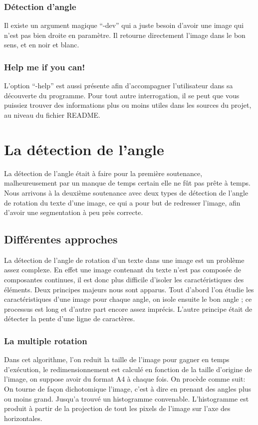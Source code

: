 \documentclass[a4paper,10pt]{report}
\begin{document}
\subsection{ D\'etection d'angle}
 Il existe un argument magique ``-dev'' qui a juste besoin d'avoir une
 image qui n'est pas bien droite en param\`etre. Il retourne directement
 l'image dans le bon sens, et en noir et blanc.
\subsection{ Help me if you can! }
 L'option ``-help'' est aussi pr\'esente afin d'accompagner
 l'utilisateur dans sa d\'ecouverte du programme. Pour tout autre
 interrogation, il se peut que vous puissiez trouver des informations
 plus ou moins utiles dans les sources du projet, au niveau du fichier
 README.


\chapter{ La d\'etection de l'angle }
 La d\'etection de l'angle \'etait \`a faire pour la premi\`ere
 soutenance, malheureusement par un manque de temps certain elle ne f\^ut
 pas pr\^ete \`a temps. Nous arrivons \`a la deuxi\`eme soutenance avec
 deux types de d\'etection de l'angle de rotation du texte d'une image,
 ce qui a pour but de redresser l'image, afin d'avoir une segmentation
 \`a peu pr\`es correcte.

\section{ Diff\'erentes approches}
 La d\'etection de l'angle de rotation d'un texte dans une image est un
 probl\`eme assez complexe. En effet une image contenant du texte n'est
 pas compos\'ee de composantes continues, il est donc plus difficile d'isoler
 les caract\'eristiques des \'el\'ements. Deux principes majeurs nous
 sont apparus. Tout d'abord l'on \'etudie les caract\'eristiques d'une
 image pour chaque angle, on isole ensuite le bon angle ; ce
 processus est long et d'autre part encore assez impr\'ecis.
 L'autre principe \'etait de d\'etecter la pente d'une ligne de caract\`eres.
\subsection{ La multiple rotation }
 Dans cet algorithme, l'on reduit la taille de l'image pour gagner en
 temps d'ex\'ecution, le redimensionnement est calcul\'e en fonction de la
 taille d'origine de l'image, on suppose avoir du format A4 \`a chaque
 fois. On proc\`ede comme suit: On tourne de fa\c con dichotomique
 l'image, c'est \`a dire en prenant des angles plus ou moins
 grand. Jusqu'a trouv\'e un histogramme convenable. L'histogramme est
 produit \`a partir de la projection de tout les pixels de l'image sur
 l'axe des horizontales.
\end{document}

